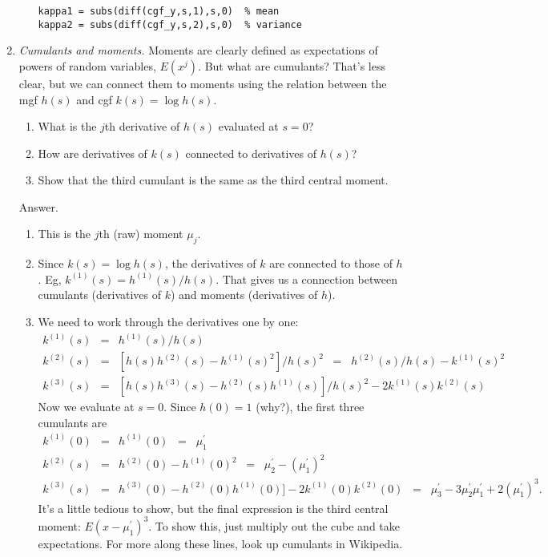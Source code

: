 \documentclass[11pt]{article}
\begin{document}
\begin{enumerate}
\begin{enumerate}
\begin{verbatim}
kappa1 = subs(diff(cgf_y,s,1),s,0)  % mean
kappa2 = subs(diff(cgf_y,s,2),s,0)  % variance
\end{verbatim}
\end{enumerate}

\item {\it Cumulants and moments.\/}
Moments are clearly defined as expectations of powers of random variables, $E(x^j)$.
But what are cumulants?
That's less clear, but we can connect them to moments using the relation
between the mgf $h(s)$ and cgf $k(s) = \log h(s)$.
\begin{enumerate}
\item What is the $j$th derivative of $h(s)$ evaluated at $s=0$?
\item How are derivatives of $k(s)$ connected to derivatives of $h(s)$?
\item Show that the third cumulant is the same as the third central moment.
\end{enumerate}
%
Answer.
\begin{enumerate}
\item This is the $j$th (raw) moment $\mu_j$.
\item Since $k(s) = \log h(s)$, the derivatives of $k$ are connected to those of $h$.
Eg, $k^{(1)}(s) =  h^{(1)}(s)/h(s) $.
That gives us a connection between cumulants (derivatives of $k$) and moments
(derivatives of $h$).
\item We need to work through the derivatives one by one:
\begin{eqnarray*}
    k^{(1)}(s) &=& h^{(1)}(s) / h(s)  \\
    k^{(2)}(s) &=& [h(s)h^{(2)}(s) - h^{(1)}(s)^2]/h(s)^2
            \;\;=\;\; h^{(2)}(s)/h(s) - k^{(1)}(s)^2 \\
    k^{(3)}(s) &=& [h(s)h^{(3)}(s) - h^{(2)}(s)h^{(1)}(s)]/h(s)^2 - 2 k^{(1)}(s) k^{(2)}(s)
\end{eqnarray*}
Now we evaluate at $s=0$.  Since $h(0) = 1$ (why?),
the first three cumulants are
\begin{eqnarray*}
    k^{(1)}(0) &=& h^{(1)}(0) \;\;=\;\; \mu_1^\prime  \\
    k^{(2)}(s) &=& h^{(2)}(0) - h^{(1)}(0)^2 \;\;=\;\; \mu_2^\prime - (\mu_1^\prime)^2 \\
    k^{(3)}(s) &=& h^{(3)}(0) - h^{(2)}(0)h^{(1)}(0)]
                    - 2 k^{(1)}(0) k^{(2)}(0)
               \;\;=\;\; \mu_3^\prime - 3 \mu_2^\prime \mu^\prime_1 + 2(\mu^\prime_1)^3 .
\end{eqnarray*}
It's a little tedious to show, but the final expression is the third
central moment:  $ E (x - \mu_1^\prime)^3$.
To show this, just multiply out the cube and take expectations.
For more along these lines, look up cumulants in Wikipedia.


\end{enumerate}
\end{enumerate}
\end{document}

